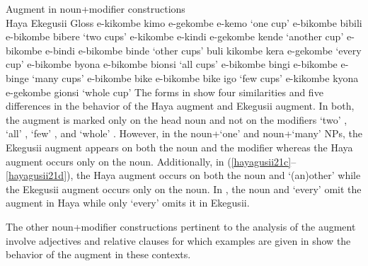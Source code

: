\documentclass[output=paper]{langscibook}
\begin{document}
\ea Augment in noun+modifier constructions\smallskip\\
\label{hayagusii21}
              \hphantom{abc }Haya				\hspace{1ex}\hphantom{eimbe e-kindi }Ekegusii			\hphantom{ie e-kemo }Gloss
  \ea\label{hayagusii21a}	e-kikombe kimo\hphantom{edi}\hspace{1ex}		e-gekombe e-kemo     		‘one cup’
  \ex\label{hayagusii21b}	e-bikombe bibili\hphantom{edi}\hspace{1ex} 		e-bikombe bibere\hphantom{tt} 		‘two cups’
  \ex\label{hayagusii21c}	e-kikombe e-kindi\hspace{1ex}\hspace{1ex}	 	e-gekombe kende\hphantom{ii}	 	‘another cup’
  \ex\label{hayagusii21d}	e-bikombe e-bindi\hspace{1ex}\hspace{1ex}		e-bikombe binde\hphantom{nt}	 	‘other cups’
  \ex\label{hayagusii21e} buli kikombe\hphantom{k kera}\hspace{1ex}			kera e-gekombe\hphantom{mt}		‘every cup’
  \ex\label{hayagusii21f}	e-bikombe byona\hphantom{ia}\hspace{1ex}		e-bikombe bionsi\hphantom{ni} 		‘all cups’
  \ex\label{hayagusii21g}	e-bikombe bingi\hphantom{mi}\hspace{1ex} 		e-bikombe e-binge\hphantom{i}		‘many cups’
  \ex\label{hayagusii21h}	e-bikombe bike\hphantom{iiaa}\hspace{1ex} 		e-bikombe bike igo		‘few cups’
  \ex\label{hayagusii21i}	e-kikombe kyona\hphantom{ii}\hspace{1ex} 		e-gekombe gionsi\hphantom{io}		‘whole cup’
  \z
\z
The forms in  show four similarities and five differences in the behavior of the Haya augment and Ekegusii augment. In both, the augment is marked only on the head noun and not on the modifiers ‘two’ , ‘all’ , ‘few’ , and ‘whole’ . However, in the noun+‘one’  and noun+‘many’  NPs, the Ekegusii augment appears on both the noun and the modifier whereas the Haya augment occurs only on the noun. Additionally, in (\ref{hayagusii21c}--\ref{hayagusii21d}), the Haya augment occurs on both the noun and ‘(an)other’ while the Ekegusii augment occurs only on the noun. In , the noun and ‘every’ omit the augment in Haya while only ‘every’ omits it in Ekegusii.

The other noun+modifier constructions pertinent to the analysis of the augment involve adjectives and relative clauses for which examples are given in  show the behavior of the augment in these contexts.
\end{document}
